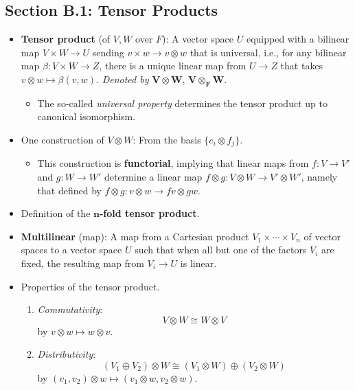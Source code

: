 \documentclass[../notes.tex]{subfiles}
\begin{document}
\subsection*{Section B.1: Tensor Products}
\begin{itemize}
    \item {}\textbf{Tensor product} (of $V,W$ over $F$): A vector space $U$ equipped with a bilinear map $V\times W\to U$ sending $v\times w\to v\otimes w$ that is universal, i.e., for any bilinear map $\beta:V\times W\to Z$, there is a unique linear map from $U\to Z$ that takes $v\otimes w\mapsto\beta(v,w)$. \emph{Denoted by} $\bm{V\otimes W}$, $\bm{V\otimes_FW}$.
    \begin{itemize}
        \item The so-called \emph{universal property} determines the tensor product up to canonical isomorphism.
    \end{itemize}
    \item One construction of $V\otimes W$: From the basis $\{e_i\otimes f_j\}$.
    \begin{itemize}
        \item This construction is \textbf{functorial}, implying that linear maps from $f:V\to V'$ and $g:W\to W'$ determine a linear map $f\otimes g:V\otimes W\to V'\otimes W'$, namely that defined by $f\otimes g:v\otimes w\to fv\otimes gw$.
    \end{itemize}
    \item Definition of the \textbf{$\bm{n}$-fold tensor product}.
    \item \textbf{Multilinear} (map): A map from a Cartesian product $V_1\times\cdots\times V_n$ of vector spaces to a vector space $U$ such that when all but one of the factors $V_i$ are fixed, the resulting map from $V_i\to U$ is linear.
    \item Properties of the tensor product.
    \begin{enumerate}
        \item \emph{Commutativity}:
        \begin{equation*}
            V\otimes W\cong W\otimes V
        \end{equation*}
        by $v\otimes w\mapsto w\otimes v$.
        \item \emph{Distributivity}:
        \begin{equation*}
            (V_1\oplus V_2)\otimes W \cong (V_1\otimes W)\oplus(V_2\otimes W)
        \end{equation*}
        by $(v_1,v_2)\otimes w\mapsto(v_1\otimes w,v_2\otimes w)$.

\end{enumerate}
\end{itemize}
\end{document}

